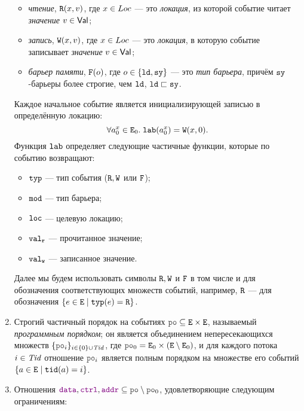 \begin{definition}
\begin{enumerate}
\begin{itemize}%
\item \emph{чтение}, $\evlab{\lR}{o}{x}{v}$, где $x\in\Loc$ --- это
  \emph{локация}, из которой событие читает \emph{значение} $v\in\Val$;
\item \emph{запись}, $\evlab{\lW}{o}{x}{v}$, где $x\in\Loc$ --- это
  \emph{локация}, в которую событие записывает \emph{значение} $v\in\Val$;
\item \emph{барьер памяти}, $\flab{o}$, где $o\in \{\ld,\full\}$ --- это \emph{тип барьера}, причём $\full$-барьеры более строгие, чем
  $\ld$, $\ld \sqsu \full$.
\end{itemize}%
Каждое начальное событие является инициализирующей записью в определённую локацию:
\[\forall a^x_0 \in \lE_0. \; \lLAB(a^x_0) = \evlab{\lW}{\pln}{x}{0}.\]
Функция $\lLAB$ определяет следующие частичные функции, которые по событию возвращают:
\begin{itemize}
  \item $\lTYP$ --- тип события ($\lR,\lW$ или $\lF$);
  \item $\lMOD$ --- тип барьера;
  \item $\lLOC$ --- целевую локацию;
  \item $\lVALR$ --- прочитанное значение;
  \item $\lVALW$ --- записанное значение.
\end{itemize}
Далее мы будем использовать символы $\lR, \lW$ и $\lF$ в том числе и для обозначения соответствующих множеств
событий, например, $\lR$ --- для обозначения $\{e\in \lE \suchthat \lTYP(e)=\lR\}$.
\item Строгий частичный порядок на событиях $\lPO \suq \lE \times \lE$, называемый \emph{программным порядком}; он
      является объединением непересекающихся множеств $\{\lPO_i\}_{i\in \{0\} \cup \Tid}$,
      где $\lPO_0=\lE_0\times (\lE\setminus \lE_0)$, и для каждого потока 
      $i\in\Tid$ отношение $\lPO_i$ является полным порядком на множестве его событий 
      $\{a\in \lE \suchthat \lTID(a)=i\}$.
\item Отношения $\lDATA,\lCTRL,\lADDR\suq \lPO\setminus \lPO_0$, удовлетворяющие следующим ограничениям:

\end{enumerate}
\end{definition}
